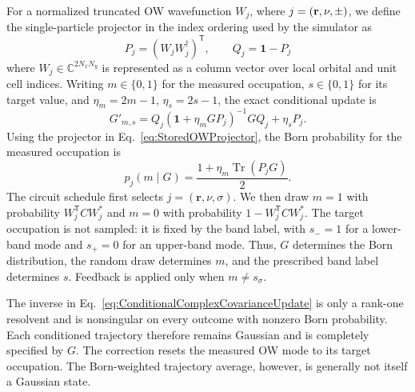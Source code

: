 \documentclass[aps,prb,twocolumn,superscriptaddress,longbibliography,floatfix]{revtex4-2}
\newcommand{\bfr}{\boldsymbol r}
\theoremstyle{plain}
\theoremstyle{definition}
\theoremstyle{remark}
\begin{document}
For a normalized truncated OW wavefunction $W_j$, where $j=(\bf{r},\nu, \pm)$, we define the single-particle projector in the index ordering used by the simulator as
\begin{equation}
    P_j=(W_jW_j^\dagger)^{\mathsf T},
    \qquad
    Q_j=\mathbf{1}-P_j
    \label{eq:StoredOWProjector}
\end{equation}
where $W_j\in\mathbb{C}^{2N_x N_y}$ is represented as a column vector over local orbital and unit cell indices.
Writing $m\in\{0,1\}$ for the measured occupation, $s\in\{0,1\}$ for its target value, and $\eta_m=2m-1$, $\eta_s=2s-1$, the exact conditional update is~\cite{BhuiyanPanJian2026}
\begin{equation}
    G'_{m,s}
    =Q_j\left(\mathbf{1}+\eta_mGP_j\right)^{-1}GQ_j
    +\eta_sP_j .
    \label{eq:ConditionalComplexCovarianceUpdate}
\end{equation}
Using the projector in Eq.~\eqref{eq:StoredOWProjector}, the Born probability for the measured occupation is
\begin{equation}
    p_j(m\mid G)
    =\frac{1+\eta_m\operatorname{Tr}(P_jG)}{2}.
    \label{eq:OWBornProbability}
\end{equation}
The circuit schedule first selects $j=(\bfr,\nu,\sigma)$. We then draw $m=1$ with probability $W_j^{\mathsf T}CW_j^*$ and $m=0$ with probability $1-W_j^{\mathsf T}CW_j^*$. The target occupation is not sampled: it is fixed by the band label, with $s_-=1$ for a lower-band mode and $s_+=0$ for an upper-band mode. Thus, $G$ determines the Born distribution, the random draw determines $m$, and the prescribed band label determines $s$. Feedback is applied only when $m\neq s_\sigma$.

The inverse in Eq.~\eqref{eq:ConditionalComplexCovarianceUpdate} is only a rank-one resolvent and is nonsingular on every outcome with nonzero Born probability. Each conditioned trajectory therefore remains Gaussian and is completely specified by $G$. The correction resets the measured OW mode to its target occupation. The Born-weighted trajectory average, however, is generally not itself a Gaussian state.
\end{document}

